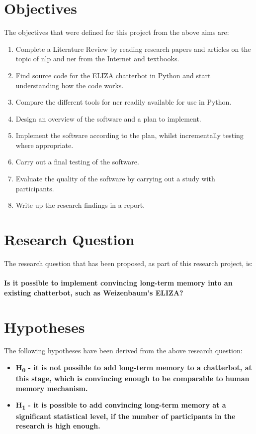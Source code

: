 \section{Objectives}
The objectives that were defined for this project from the above aims are:
\begin{enumerate}
	\item Complete a Literature Review by reading research papers and articles on the topic of \gls{nlp} and \gls{ner} from the Internet and textbooks.
	\item Find source code for the ELIZA chatterbot in Python and start understanding how the code works.
	\item Compare the different tools for \gls{ner} readily available for use in Python.
	\item Design an overview of the software and a plan to implement.
	\item Implement the software according to the plan, whilst incrementally testing where appropriate.
	\item Carry out a final testing of the software.
	\item Evaluate the quality of the software by carrying out a study with participants.
	\item Write up the research findings in a report.
\end{enumerate}

\section{Research Question}
The research question that has been proposed, as part of this research project, is:\\\\
\textbf{Is it possible to implement convincing long-term memory into an existing chatterbot, such as Weizenbaum's ELIZA?} 

\section{Hypotheses}
The following hypotheses have been derived from the above research question:
\begin{itemize}
	\item \textbf{H\textsubscript{0} - it is not possible to add long-term memory to a chatterbot, at this stage, which is convincing enough to be comparable to human memory mechanism.}
	\item \textbf{H\textsubscript{1} - it is possible to add convincing long-term memory at a significant statistical level, if the number of participants in the research is high enough.}
\end{itemize}

